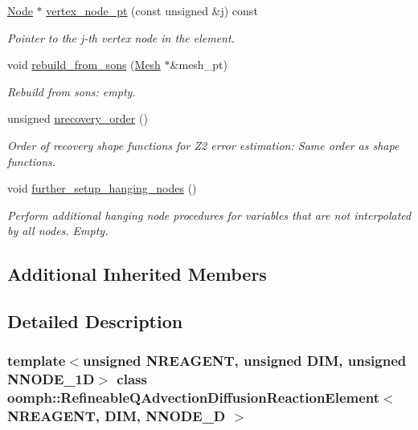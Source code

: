 \begin{DoxyCompactItemize}
\hyperlink{classoomph_1_1Node}{Node} $\ast$ \hyperlink{classoomph_1_1RefineableQAdvectionDiffusionReactionElement_a9e14ec5dac9dabd46547d8724f502ff4}{vertex\+\_\+node\+\_\+pt} (const unsigned \&j) const
\begin{DoxyCompactList}\small\item\em Pointer to the j-\/th vertex node in the element. \end{DoxyCompactList}\item 
void \hyperlink{classoomph_1_1RefineableQAdvectionDiffusionReactionElement_ac659fcbaab375aad151052eecf353c2a}{rebuild\+\_\+from\+\_\+sons} (\hyperlink{classoomph_1_1Mesh}{Mesh} $\ast$\&mesh\+\_\+pt)
\begin{DoxyCompactList}\small\item\em Rebuild from sons\+: empty. \end{DoxyCompactList}\item 
unsigned \hyperlink{classoomph_1_1RefineableQAdvectionDiffusionReactionElement_a836f98dc3fd33e58860d243023a0f991}{nrecovery\+\_\+order} ()
\begin{DoxyCompactList}\small\item\em Order of recovery shape functions for Z2 error estimation\+: Same order as shape functions. \end{DoxyCompactList}\item 
void \hyperlink{classoomph_1_1RefineableQAdvectionDiffusionReactionElement_a34b2a52ea365d136e3f60fa12550b57b}{further\+\_\+setup\+\_\+hanging\+\_\+nodes} ()
\begin{DoxyCompactList}\small\item\em Perform additional hanging node procedures for variables that are not interpolated by all nodes. Empty. \end{DoxyCompactList}\end{DoxyCompactItemize}
\subsection*{Additional Inherited Members}


\subsection{Detailed Description}
\subsubsection*{template$<$unsigned N\+R\+E\+A\+G\+E\+NT, unsigned D\+IM, unsigned N\+N\+O\+D\+E\+\_\+1D$>$\newline
class oomph\+::\+Refineable\+Q\+Advection\+Diffusion\+Reaction\+Element$<$ N\+R\+E\+A\+G\+E\+N\+T, D\+I\+M, N\+N\+O\+D\+E\+\_\+D $>$}

